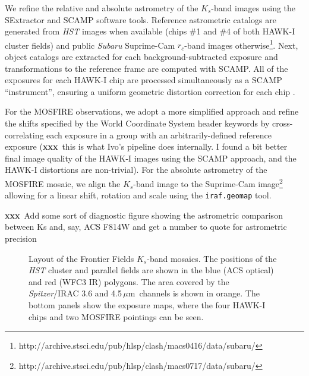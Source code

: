\documentclass[iop, numberedappendix]{emulateapj}
\gdef\mum{$\mu\mathrm{m}$}
\gdef\xxx{\textbf{xxx}}
\begin{document}
We refine the relative and absolute astrometry of the $K_s$-band images using the SExtractor \citep{bertin:96} and SCAMP \citep{scamp} software tools. Reference astrometric catalogs are generated from \textit{HST} images when available (chips \#1 and \#4 of both HAWK-I cluster fields) and public \textit{Subaru} Suprime-Cam $r_c$-band images otherwise\footnote{http://archive.stsci.edu/pub/hlsp/clash/macs0416/data/subaru/}.  Next, object catalogs are extracted for each background-subtracted exposure and transformations to the reference frame are computed with SCAMP.  All of the exposures for each HAWK-I chip are processed simultaneously as a SCAMP ``instrument'', ensuring a uniform geometric distortion correction for each chip \citep[see also][for a detailed discussion of the HAWK-I geometric distortion]{libralato:14}.

For the MOSFIRE observations, we adopt a more simplified approach and refine the shifts specified by the World Coordinate System header keywords by cross-correlating each exposure in a group with an arbitrarily-defined reference exposure (\xxx\ this is what Ivo's pipeline does internally.  I found a bit better final image quality of the HAWK-I images using the SCAMP approach, and the HAWK-I distortions are non-trivial).  For the absolute astrometry of the MOSFIRE mosaic, we align the $K_s$-band image to the Suprime-Cam image\footnote{http://archive.stsci.edu/pub/hlsp/clash/macs0717/data/subaru/} allowing for a linear shift, rotation and scale using the \texttt{iraf.geomap} tool.

\xxx\ Add some sort of diagnostic figure showing the astrometric comparison between Ks and, say, ACS F814W and get a number to quote for astrometric precision

\begin{figure*}
\caption{Layout of the Frontier Fields $K_s$-band mosaics.  The positions of the \textit{HST} cluster and parallel fields are shown in the blue (ACS optical) and red (WFC3 IR) polygons.  The area covered by the \textit{Spitzer}/IRAC 3.6 and 4.5\,\mum\ channels is shown in orange.  The bottom panels show the exposure maps, where the four HAWK-I chips and two MOSFIRE pointings can be seen.\label{fig:layout}}  
\end{figure*}
\end{document}
